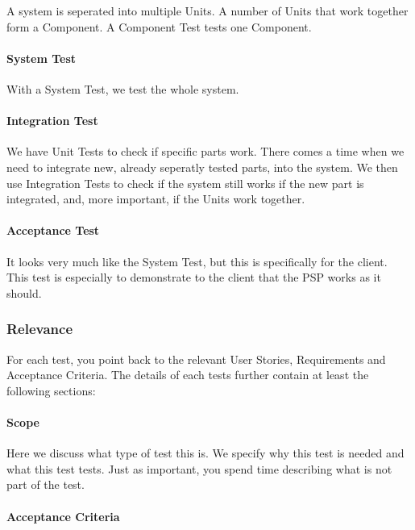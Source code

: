 \documentclass[10pt]{report}
\begin{document}
A system is seperated into multiple Units. A number of Units that work together form a Component. A Component Test tests one Component.

\paragraph{System Test}

With a System Test, we test the whole system.

\paragraph{Integration Test}

We have Unit Tests to check if specific parts work. There comes a time when we need to integrate new, already seperatly tested parts, into the system. We then use Integration Tests to check if the system still works if the new part is integrated, and, more important, if the Units work together.

\paragraph{Acceptance Test}

It looks very much like the System Test, but this is specifically for the client. This test is especially to demonstrate to the client that the PSP works as it should.

\subsubsection{Relevance}

For each test, you point back to the relevant User Stories, Requirements and Acceptance Criteria. The details of each tests further contain at least the following sections:

\paragraph{Scope}

Here we discuss what type of test this is. We specify why this test is needed and what this test tests. Just as important, you spend time describing what is not part of the test.

\paragraph{Acceptance Criteria}
\end{document}
